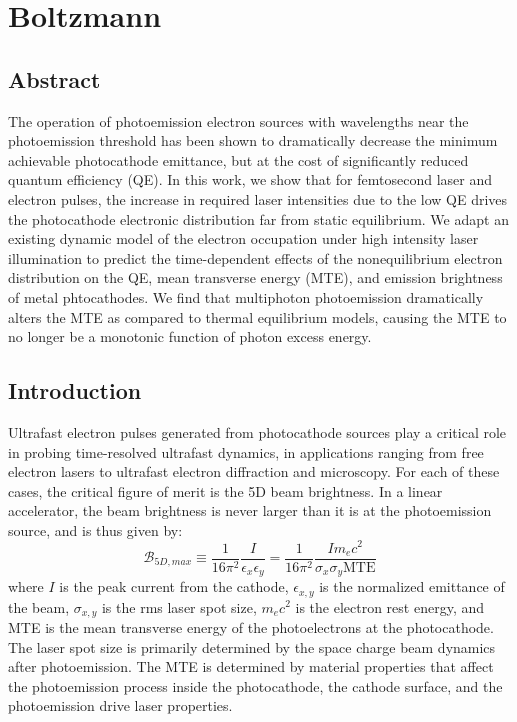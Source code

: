 \chapter{Boltzmann}
\section{Abstract}
The operation of photoemission electron sources with wavelengths near the photoemission threshold has been shown to dramatically decrease the minimum achievable photocathode emittance, but at the cost of significantly reduced quantum efficiency (QE). In this work, we show that for femtosecond laser and electron pulses, the increase in required laser intensities due to the low QE drives the photocathode electronic distribution far from static equilibrium. We adapt an existing dynamic model of the electron occupation under high intensity laser illumination to predict the time-dependent effects of the nonequilibrium electron distribution on the QE, mean transverse energy (MTE), and emission brightness of metal phtocathodes. We find that multiphoton photoemission dramatically alters the MTE as compared to thermal equilibrium models, causing the MTE to no longer be a monotonic function of photon excess energy. 

\section{Introduction}
Ultrafast  electron pulses generated from photocathode sources play a critical role in probing time-resolved ultrafast dynamics, in applications ranging from free electron lasers\cite{fel} to ultrafast electron diffraction\cite{ued} and microscopy.\cite{uem} For each of these cases, the critical figure of merit is the 5D beam brightness. In a linear accelerator, the beam brightness is never larger than it is at the photoemission source, and is thus given by:\cite{Rhee1992,ttm,pancake}
\begin{equation}\label{eq_brightness}
	\mathcal{B}_{5D, max} \equiv \frac{1}{16 \pi^2} \frac{I}{\epsilon_x \epsilon_y} = \frac{1}{16 \pi^2} \frac{I m_e c^2}{\sigma_x \sigma_y \textrm{MTE}} 
\end{equation}
where $I$ is the peak current from the cathode, $\epsilon_{x,y}$ is the normalized emittance of the beam, $\sigma_{x,y}$ is the rms laser spot size, $m_e c^2$ is the electron rest energy, and MTE is the mean transverse energy of the photoelectrons at the photocathode.\cite{Musumeci2018} The laser spot size is primarily determined by the space charge beam dynamics after photoemission. The MTE is determined by material properties that affect the photoemission process inside the photocathode, the cathode surface, and the photoemission drive laser properties.


